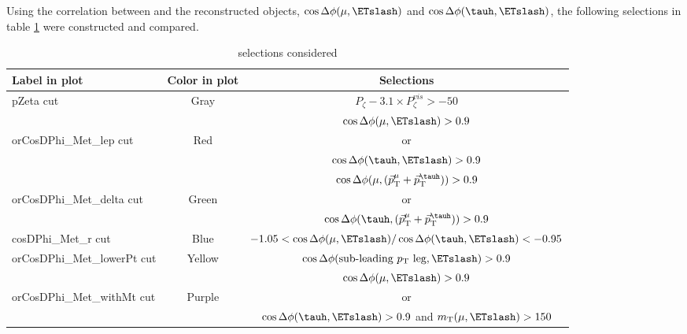 Using the correlation between \ETslash and the reconstructed objects, 
$\cos{\Delta \phi (\mu,\ETslash)}$ and $\cos{\Delta \phi (\tauh,\ETslash)}$, 
the following selections in table \ref{table:selectionsConsidered} were constructed and compared.
{\renewcommand{\arraystretch}{1.5}%
\begin{table}
\begin{center}
  \caption{selections considered \label{table:selectionsConsidered}}
  \begin{tabular}{| l | c | c |}
  \hline
    Label in plot           & Color in plot     & Selections \\[0.5ex] \hline
    pZeta cut               & Gray              & $P_{\zeta}- 3.1 \times P_{\zeta}^{vis} > -50$ \\ \hline
                            &                   & $\cos{\Delta \phi (\mu,\ETslash)} > 0.9$ \\
    orCosDPhi\_Met\_lep cut & Red               & or \\
                            &                   & $\cos{\Delta \phi (\tauh,\ETslash)} > 0.9$ \\ \hline
                            &                   & $\cos{\Delta \phi (\mu,(\vec{p}^{\mu}_{\text{T}} + \vec{p}^{\tauh}_{\text{T}}))} > 0.9$ \\
    orCosDPhi\_Met\_delta cut & Green           & or \\
                            &                   & $\cos{\Delta \phi (\tauh,(\vec{p}^{\mu}_{\text{T}} + \vec{p}^{\tauh}_{\text{T}}))} > 0.9$ \\ \hline
    cosDPhi\_Met\_r cut     & Blue              & $ -1.05 < \cos{\Delta \phi (\mu,\ETslash)}/\cos{\Delta \phi (\tauh,\ETslash)} < -0.95$ \\ \hline
    orCosDPhi\_Met\_lowerPt cut & Yellow        & $\cos{\Delta \phi (\text{sub-leading } p_{\text{T}}~\text{leg},\ETslash)} > 0.9$ \\ \hline
                            &                   & $\cos{\Delta \phi (\mu,\ETslash)} > 0.9$ \\
    orCosDPhi\_Met\_withMt cut & Purple         & or \\
                            &                   & $\cos{\Delta \phi (\tauh,\ETslash)} > 0.9$  and $m_{\text{T}}(\mu,\ETslash) > 150$\\ \hline

  \hline
  \end{tabular}
\end{center}
\end{table}} \quad

